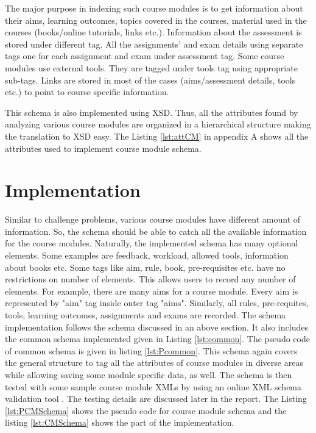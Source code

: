 \documentclass[11pt,letterpaper]{report}
\begin{document}
The major purpose in indexing such course modules is to get information about their aims, learning outcomes, topics covered in the courses, material used in the courses (books/online tutorials, links etc.). Information about the assessment is stored under different tag. All the assignments' and exam details using separate tags one for each assignment and exam under assessment tag. Some course modules use external tools. They are tagged under tools tag using appropriate sub-tags. Links are stored in most of the cases (aims/assessment details, tools etc.) to point to course specific information.     
 
This schema is also implemented using XSD. Thus, all the attributes found by analyzing various course modules are organized in a hierarchical structure making the translation to XSD easy. The Listing \ref{lst:attCM} in appendix A shows all the attributes used to implement course module schema.


\section{Implementation}
Similar to challenge problems, various course modules have different amount of information. So, the schema should be able to catch all the available information for the course modules. Naturally, the implemented schema has many optional elements. Some examples are feedback, workload, allowed tools, information about books etc. Some tags like aim, rule, book, pre-requisites etc. have no restrictions on number of elements. This allows users to record any number of elements. For example, there are many aims for a course module. Every aim is represented by "aim" tag inside outer tag "aims". Similarly, all rules, pre-requites, tools, learning outcomes, assignments and exams are recorded.    
The schema implementation follows the schema discussed in an above section. It also includes the common schema implemented given in Listing \ref{lst:common}. The pseudo code of common schema is given in listing \ref{lst:Pcommon}. This schema again covers the general structure to tag all the attributes of course modules in diverse areas while allowing saving some module specific data, as well. The schema is then tested with some sample course module XMLs by using an online XML schema validation tool \cite{olXSD}. The testing details are discussed later in the report.  The Listing \ref{lst:PCMSchema} shows the pseudo code for course module schema and the listing \ref{lst:CMSchema} shows the part of the implementation.
 
\end{document}

